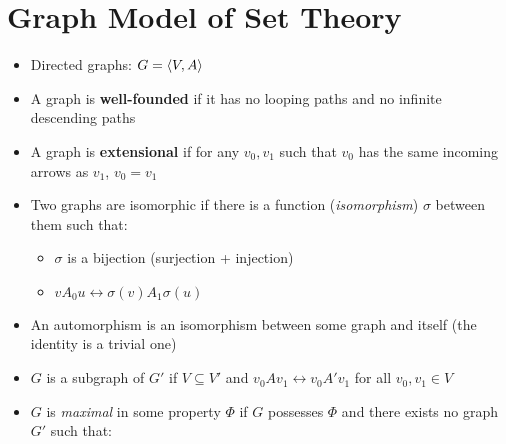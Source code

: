 \section{Graph Model of Set Theory}

\begin{itemize}
	
	\item Directed graphs: $ G = \langle V, A \rangle $
	
%		
%		
%		

	\item A graph is \textbf{well-founded} if it has no looping paths and no infinite descending paths
	
	\item A graph is \textbf{extensional} if for any $ v_0, v_1 $ such that $ v_0 $ has the same incoming arrows as $ v_1 $, $ v_0 = v_1 $
	
	\item Two graphs are isomorphic if there is a function (\textit{isomorphism}) $ \sigma $ between them such that:
	
	\begin{itemize}
		
		\item $ \sigma $ is a bijection (surjection + injection)
		
		\item $ vA_0 u \leftrightarrow \sigma(v) A_1 \sigma(u) $
		
	\end{itemize}

	\item An automorphism is an isomorphism between some graph and itself (the identity is a trivial one)
	
	\item $ G $ is a subgraph of $ G' $ if $ V \subseteq V' $ and $ v_0 A v_1 \leftrightarrow v_0 A' v_1 $ for all $ v_0, v_1 \in V $
	
	\item $ G $ is \textit{maximal} in some property $ \Phi $ if $ G $ possesses $ \Phi $ and there exists no graph $ G' $ such that:
	
	\begin{itemize}
		

\end{itemize}
\end{itemize}
